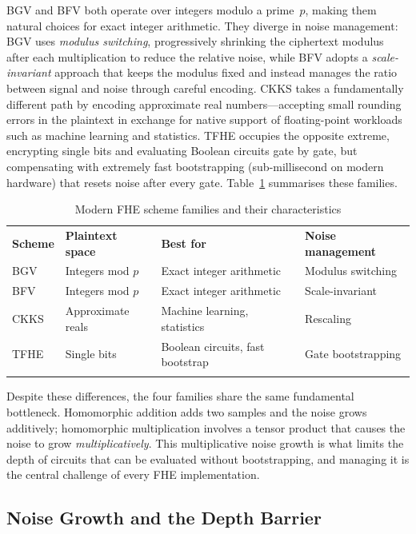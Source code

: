 BGV and BFV both operate over integers modulo a prime~$p$, making them natural choices for exact integer arithmetic.  They diverge in noise management: BGV uses \emph{modulus switching}, progressively shrinking the ciphertext modulus after each multiplication to reduce the relative noise, while BFV adopts a \emph{scale-invariant} approach that keeps the modulus fixed and instead manages the ratio between signal and noise through careful encoding.  CKKS takes a fundamentally different path by encoding approximate real numbers---accepting small rounding errors in the plaintext in exchange for native support of floating-point workloads such as machine learning and statistics.  TFHE occupies the opposite extreme, encrypting single bits and evaluating Boolean circuits gate by gate, but compensating with extremely fast bootstrapping (sub-millisecond on modern hardware) that resets noise after every gate.  Table~\ref{tab:fhe-schemes} summarises these families.

\begin{table}[t]
\caption{Modern FHE scheme families and their characteristics}
\label{tab:fhe-schemes}
\begin{tabular}{p{2cm}p{3.5cm}p{3cm}p{3cm}}
\hline\noalign{\smallskip}
\textbf{Scheme} & \textbf{Plaintext space} & \textbf{Best for} & \textbf{Noise management} \\
\noalign{\smallskip}\svhline\noalign{\smallskip}
BGV & Integers mod $p$ & Exact integer arithmetic & Modulus switching \\
BFV & Integers mod $p$ & Exact integer arithmetic & Scale-invariant \\
CKKS & Approximate reals & Machine learning, statistics & Rescaling \\
TFHE & Single bits & Boolean circuits, fast bootstrap & Gate bootstrapping \\
\noalign{\smallskip}\hline
\end{tabular}
\end{table}

Despite these differences, the four families share the same fundamental bottleneck.  Homomorphic addition adds two \lwe{} samples and the noise grows additively; homomorphic multiplication involves a tensor product that causes the noise to grow \emph{multiplicatively}.  This multiplicative noise growth is what limits the depth of circuits that can be evaluated without bootstrapping, and managing it is the central challenge of every FHE implementation.


\subsection{Noise Growth and the Depth Barrier}
\label{subsec:noise-growth}

